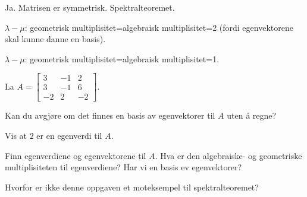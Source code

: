 \begin{losning}


\begin{punkt}
Ja. Matrisen er symmetrisk. Spektralteoremet.
\end{punkt}

\begin{punkt}
$\lambda-\mu$: geometrisk multiplisitet=algebraisk multiplisitet=2 (fordi egenvektorene skal kunne danne en basis).

\noindent
$\lambda-\mu$: geometrisk multiplisitet=algebraisk multiplisitet=1.

\end{punkt}


\end{losning}


\begin{oppgave}
La $A=\begin{bmatrix}
3 & -1 & 2\\
3 & -1 & 6\\
-2 & 2 & -2
\end{bmatrix}$. 

\begin{punkt}
Kan du avgjøre om det finnes en basis av egenvektorer til $A$ uten å regne?
\end{punkt}

\begin{punkt}
Vis at $2$ er en egenverdi til $A$.
\end{punkt}


\begin{punkt}
Finn egenverdiene og egenvektorene til $A$. Hva er den algebraiske- og geometriske multiplisiteten til egenverdiene? Har vi en basis ev egenvektorer?
\end{punkt}

\begin{punkt}
Hvorfor er ikke denne oppgaven et moteksempel til spektralteoremet?
\end{punkt}

\end{oppgave}


